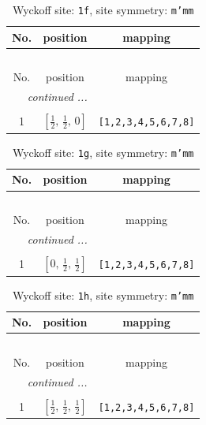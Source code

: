 \documentclass[fleqn,8pt]{jsarticle}
\begin{document}
\renewcommand{\arraystretch}{1.2}
\begin{longtable}{ccc}
\caption{Wyckoff site: {\tt 1f}, site symmetry: {\tt m'mm}}
 \\
 \hline \hline
No. & position & mapping \\ \hline \endfirsthead

\multicolumn{2}{l}{\tablename\ \thetable{}} \\
 \hline \hline
No. & position & mapping \\ \hline \endhead

 \hline \hline
\multicolumn{2}{r}{\footnotesize\it continued ...} \\ \endfoot

 \hline \hline
\multicolumn{2}{r}{} \\ \endlastfoot

1 & $\left[ \frac{1}{2},\, \frac{1}{2},\, 0 \right]$ & {\tt [1,2,3,4,5,6,7,8]} \\
\end{longtable}
\renewcommand{\arraystretch}{1.2}
\begin{longtable}{ccc}
\caption{Wyckoff site: {\tt 1g}, site symmetry: {\tt m'mm}}
 \\
 \hline \hline
No. & position & mapping \\ \hline \endfirsthead

\multicolumn{2}{l}{\tablename\ \thetable{}} \\
 \hline \hline
No. & position & mapping \\ \hline \endhead

 \hline \hline
\multicolumn{2}{r}{\footnotesize\it continued ...} \\ \endfoot

 \hline \hline
\multicolumn{2}{r}{} \\ \endlastfoot

1 & $\left[ 0,\, \frac{1}{2},\, \frac{1}{2} \right]$ & {\tt [1,2,3,4,5,6,7,8]} \\
\end{longtable}
\renewcommand{\arraystretch}{1.2}
\begin{longtable}{ccc}
\caption{Wyckoff site: {\tt 1h}, site symmetry: {\tt m'mm}}
 \\
 \hline \hline
No. & position & mapping \\ \hline \endfirsthead

\multicolumn{2}{l}{\tablename\ \thetable{}} \\
 \hline \hline
No. & position & mapping \\ \hline \endhead

 \hline \hline
\multicolumn{2}{r}{\footnotesize\it continued ...} \\ \endfoot

 \hline \hline
\multicolumn{2}{r}{} \\ \endlastfoot

1 & $\left[ \frac{1}{2},\, \frac{1}{2},\, \frac{1}{2} \right]$ & {\tt [1,2,3,4,5,6,7,8]} \\
\end{longtable}
\end{document}
